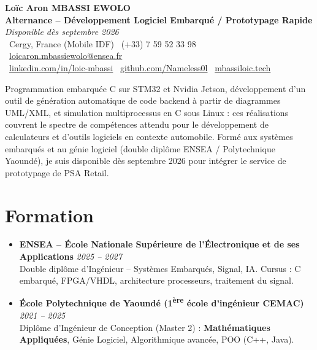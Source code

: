 \documentclass[a4paper,11pt]{article}
\begin{document}
\begin{center}
    {\Large \textbf{Loïc Aron MBASSI EWOLO}} \\ \vspace{4pt}
    \textbf{\large Alternance -- Développement Logiciel Embarqué / Prototypage Rapide} \\
    \textit{\small Disponible dès septembre 2026} \\ \vspace{4pt}
    \small
    \faMapMarker\ Cergy, France (Mobile IDF) \quad
    \faPhone\ (+33) 7 59 52 33 98 \quad
    \faEnvelope\ \href{mailto:loicaron.mbassiewolo@ensea.fr}{loicaron.mbassiewolo@ensea.fr} \\ \vspace{2pt}
    \faLinkedin\ \href{https://www.linkedin.com/in/loic-mbassi/}{linkedin.com/in/loic-mbassi} \quad
    \faGithub\ \href{https://github.com/Nameless0l}{github.com/Nameless0l} \quad
    \faGlobe\ \href{https://mbassiloic.tech}{mbassiloic.tech}
\end{center}

\vspace{-6pt}

\noindent\small{Programmation embarquée C sur STM32 et Nvidia Jetson, développement d'un outil de génération automatique de code backend à partir de diagrammes UML/XML, et simulation multiprocessus en C sous Linux : ces réalisations couvrent le spectre de compétences attendu pour le développement de calculateurs et d'outils logiciels en contexte automobile. Formé aux systèmes embarqués et au génie logiciel (double diplôme ENSEA / Polytechnique Yaoundé), je suis disponible dès septembre 2026 pour intégrer le service de prototypage de PSA Retail.}

\vspace{2pt}

\section{Formation}
\begin{itemize}[leftmargin=*, label=\tiny$\bullet$, nosep]
    \item \textbf{ENSEA -- École Nationale Supérieure de l'Électronique et de ses Applications} \hfill \textit{2025 -- 2027} \\
    \small{Double diplôme d'Ingénieur -- Systèmes Embarqués, Signal, IA. Cursus : C embarqué, FPGA/VHDL, architecture processeurs, traitement du signal.}
    \item \textbf{École Polytechnique de Yaoundé (1\textsuperscript{ère} école d'ingénieur CEMAC)} \hfill \textit{2021 -- 2025} \\
    \small{Diplôme d'Ingénieur de Conception (Master 2) : \textbf{Mathématiques Appliquées}, Génie Logiciel, Algorithmique avancée, POO (C++, Java).}
\end{itemize}
\end{document}
